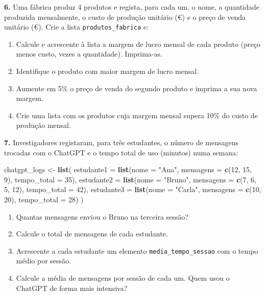 \documentclass[
  portuguese,
  11pt,
  openany]{book}
\newenvironment{Shaded}{\begin{snugshade}}{\end{snugshade}}
\newcommand{\AttributeTok}[1]{\textcolor[rgb]{0.13,0.29,0.53}{#1}}
\newcommand{\DecValTok}[1]{\textcolor[rgb]{0.00,0.00,0.81}{#1}}
\newcommand{\FunctionTok}[1]{\textcolor[rgb]{0.13,0.29,0.53}{\textbf{#1}}}
\newcommand{\NormalTok}[1]{#1}
\newcommand{\OtherTok}[1]{\textcolor[rgb]{0.56,0.35,0.01}{#1}}
\newcommand{\StringTok}[1]{\textcolor[rgb]{0.31,0.60,0.02}{#1}}
\providecommand{\tightlist}{%
  \setlength{\itemsep}{0pt}\setlength{\parskip}{0pt}}
\begin{document}
\textbf{6.} Uma fábrica produz 4 produtos e regista, para cada um, o nome, a quantidade
produzida mensalmente, o custo de produção unitário (€) e o preço de venda
unitário (€). Crie a lista \texttt{produtos\_fabrica} e:

\begin{enumerate}
\def\labelenumi{(\alph{enumi})}
\tightlist
\item
  Calcule e acrescente à lista a margem de lucro mensal de cada produto (preço
  menos custo, vezes a quantidade). Imprima-as.
\item
  Identifique o produto com maior margem de lucro mensal.
\item
  Aumente em 5\% o preço de venda do segundo produto e imprima a sua nova margem.
\item
  Crie uma lista com os produtos cuja margem mensal supera 10\% do custo de
  produção mensal.
\end{enumerate}

\textbf{7.} Investigadores registaram, para três estudantes, o número de mensagens
trocadas com o ChatGPT e o tempo total de uso (minutos) numa semana:

\begin{Shaded}
\begin{Highlighting}[]
\NormalTok{chatgpt\_logs }\OtherTok{\textless{}{-}} \FunctionTok{list}\NormalTok{(}
  \AttributeTok{estudante1 =} \FunctionTok{list}\NormalTok{(}\AttributeTok{nome =} \StringTok{"Ana"}\NormalTok{, }\AttributeTok{mensagens =} \FunctionTok{c}\NormalTok{(}\DecValTok{12}\NormalTok{, }\DecValTok{15}\NormalTok{, }\DecValTok{9}\NormalTok{), }\AttributeTok{tempo\_total =} \DecValTok{35}\NormalTok{),}
  \AttributeTok{estudante2 =} \FunctionTok{list}\NormalTok{(}\AttributeTok{nome =} \StringTok{"Bruno"}\NormalTok{, }\AttributeTok{mensagens =} \FunctionTok{c}\NormalTok{(}\DecValTok{7}\NormalTok{, }\DecValTok{6}\NormalTok{, }\DecValTok{5}\NormalTok{, }\DecValTok{12}\NormalTok{), }\AttributeTok{tempo\_total =} \DecValTok{42}\NormalTok{),}
  \AttributeTok{estudante3 =} \FunctionTok{list}\NormalTok{(}\AttributeTok{nome =} \StringTok{"Carla"}\NormalTok{, }\AttributeTok{mensagens =} \FunctionTok{c}\NormalTok{(}\DecValTok{10}\NormalTok{, }\DecValTok{20}\NormalTok{), }\AttributeTok{tempo\_total =} \DecValTok{28}\NormalTok{)}
\NormalTok{)}
\end{Highlighting}
\end{Shaded}

\begin{enumerate}
\def\labelenumi{(\alph{enumi})}
\tightlist
\item
  Quantas mensagens enviou o Bruno na terceira sessão?
\item
  Calcule o total de mensagens de cada estudante.
\item
  Acrescente a cada estudante um elemento \texttt{media\_tempo\_sessao} com o tempo médio
  por sessão.
\item
  Calcule a média de mensagens por sessão de cada um. Quem usou o ChatGPT de
  forma mais intensiva?
\end{enumerate}
\end{document}
